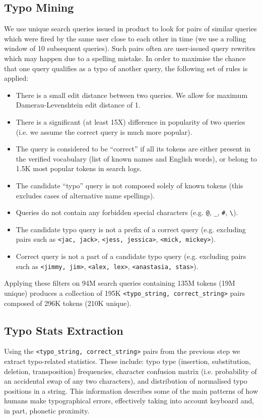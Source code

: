 \documentclass[11pt,a4paper]{article}
\begin{document}
\subsection{Typo Mining\label{sec:typo_mining}}
We use unique search queries issued in {\fi} product to look for pairs of similar queries which were fired by the same user close to each other in time (we use a rolling window of 10 subsequent queries). Such pairs often are user-issued query rewrites which may happen due to a spelling mistake. In order to maximise the chance that one query qualifies as a typo of another query, the following set of rules is applied:
\begin{itemize}
\item There is a small edit distance between two queries. We allow for maximum Damerau-Levenshtein edit distance \cite{damerau1964technique} of 1.
\item There is a significant (at least 15X) difference in popularity of two queries (i.e. we assume the correct query is much more popular).
\item The query is considered to be “correct” if all its tokens are either present in the verified vocabulary (list of known names and English words), or belong to 1.5K most popular tokens in search logs.
\item The candidate “typo” query is not composed solely of known tokens (this excludes cases of alternative name spellings).
\item Queries do not contain any forbidden special characters (e.g. \texttt{@}, \texttt{\_}, \texttt{\#}, \texttt{\textbackslash}).
\item The candidate typo query is not a prefix of a correct query (e.g. excluding pairs such as \texttt{<jac, jack>}, \texttt{<jess, jessica>}, \texttt{<mick, mickey>}).
\item Correct query is not a part of a candidate typo query (e.g. excluding pairs such as \texttt{<jimmy, jim>}, \texttt{<alex, lex>}, \texttt{<anastasia, stas>}).
\end{itemize}
Applying these filters on 94M search queries containing 135M tokens (19M unique) produces a collection of 195K \texttt{<typo\_string, correct\_string>} pairs composed of 296K tokens (210K unique).

\subsection{Typo Stats Extraction\label{sec:typo_stats_extraction}}
Using the \texttt{<typo\_string, correct\_string>} pairs from the previous step we extract typo-related statistics. These include: typo type (insertion, substitution, deletion, transposition) frequencies, character confusion matrix (i.e. probability of an accidental swap of any two characters), and distribution of normalised typo positions in a string. This information describes some of the main patterns of how humans make typographical errors, effectively taking into account keyboard and, in part, phonetic proximity.
\end{document}

